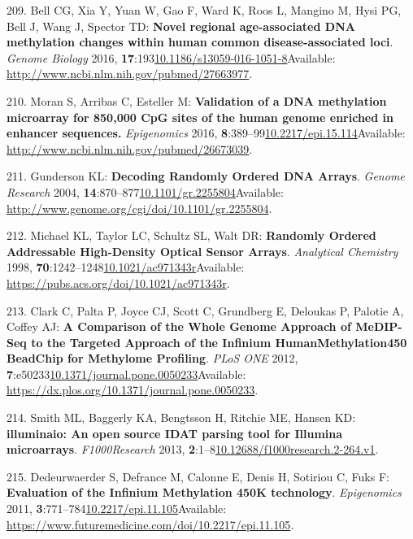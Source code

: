 \documentclass[
]{book}
\begin{document}
\leavevmode\hypertarget{ref-Bell2016}{}%
209. Bell CG, Xia Y, Yuan W, Gao F, Ward K, Roos L, Mangino M, Hysi PG, Bell J, Wang J, Spector TD: \textbf{Novel regional age-associated DNA methylation changes within human common disease-associated loci}. \emph{Genome Biology} 2016, \textbf{17}:193\href{https://doi.org/10.1186/s13059-016-1051-8}{10.1186/s13059-016-1051-8}Available: \url{http://www.ncbi.nlm.nih.gov/pubmed/27663977}.

\leavevmode\hypertarget{ref-Moran2015}{}%
210. Moran S, Arribas C, Esteller M: \textbf{Validation of a DNA methylation microarray for 850,000 CpG sites of the human genome enriched in enhancer sequences.} \emph{Epigenomics} 2016, \textbf{8}:389--99\href{https://doi.org/10.2217/epi.15.114}{10.2217/epi.15.114}Available: \url{http://www.ncbi.nlm.nih.gov/pubmed/26673039}.

\leavevmode\hypertarget{ref-Gunderson2004}{}%
211. Gunderson KL: \textbf{Decoding Randomly Ordered DNA Arrays}. \emph{Genome Research} 2004, \textbf{14}:870--877\href{https://doi.org/10.1101/gr.2255804}{10.1101/gr.2255804}Available: \url{http://www.genome.org/cgi/doi/10.1101/gr.2255804}.

\leavevmode\hypertarget{ref-Michael1998}{}%
212. Michael KL, Taylor LC, Schultz SL, Walt DR: \textbf{Randomly Ordered Addressable High-Density Optical Sensor Arrays}. \emph{Analytical Chemistry} 1998, \textbf{70}:1242--1248\href{https://doi.org/10.1021/ac971343r}{10.1021/ac971343r}Available: \url{https://pubs.acs.org/doi/10.1021/ac971343r}.

\leavevmode\hypertarget{ref-Clark2012}{}%
213. Clark C, Palta P, Joyce CJ, Scott C, Grundberg E, Deloukas P, Palotie A, Coffey AJ: \textbf{A Comparison of the Whole Genome Approach of MeDIP-Seq to the Targeted Approach of the Infinium HumanMethylation450 BeadChip for Methylome Profiling}. \emph{PLoS ONE} 2012, \textbf{7}:e50233\href{https://doi.org/10.1371/journal.pone.0050233}{10.1371/journal.pone.0050233}Available: \url{https://dx.plos.org/10.1371/journal.pone.0050233}.

\leavevmode\hypertarget{ref-Smith2013}{}%
214. Smith ML, Baggerly KA, Bengtsson H, Ritchie ME, Hansen KD: \textbf{illuminaio: An open source IDAT parsing tool for Illumina microarrays}. \emph{F1000Research} 2013, \textbf{2}:1--8\href{https://doi.org/10.12688/f1000research.2-264.v1}{10.12688/f1000research.2-264.v1}.

\leavevmode\hypertarget{ref-Dedeurwaerder2011}{}%
215. Dedeurwaerder S, Defrance M, Calonne E, Denis H, Sotiriou C, Fuks F: \textbf{Evaluation of the Infinium Methylation 450K technology}. \emph{Epigenomics} 2011, \textbf{3}:771--784\href{https://doi.org/10.2217/epi.11.105}{10.2217/epi.11.105}Available: \url{https://www.futuremedicine.com/doi/10.2217/epi.11.105}.
\end{document}
